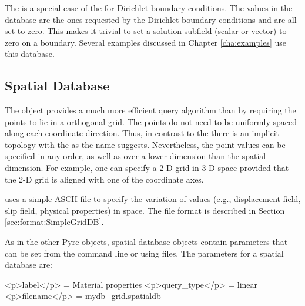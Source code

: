 \subsubsection{}

The  is a special case of the  for
Dirichlet boundary conditions. The values in the database are the ones
requested by the Dirichlet boundary conditions and are all set to
zero. This makes it trivial to set a solution subfield (scalar or
vector) to zero on a boundary. Several examples discussed in Chapter
\vref{cha:examples} use this database.


\subsection{ Spatial Database}

The  object provides a much more efficient query
algorithm than  by requiring the points to lie in a
orthogonal grid. The points do not need to be uniformly spaced along
each coordinate direction. Thus, in contrast to the 
there is an implicit topology with the  as the
name suggests. Nevertheless, the point values can be specified in any
order, as well as over a lower-dimension than the spatial dimension.
For example, one can specify a 2-D grid in 3-D space provided that the
2-D grid is aligned with one of the coordinate axes.

 uses a simple ASCII file to specify the variation of
values (e.g., displacement field, slip field, physical properties) in
space. The file format is described in Section
\vref{sec:format:SimpleGridDB}.

As in the other Pyre objects, spatial database objects contain parameters
that can be set from the command line or using 
files. The parameters for a spatial database are:
\begin{inventory}
\end{inventory}

\begin{cfg}
<p>label</p> = Material properties
<p>query_type</p> = linear
<p>filename</p> = mydb_grid.spatialdb
\end{cfg}


